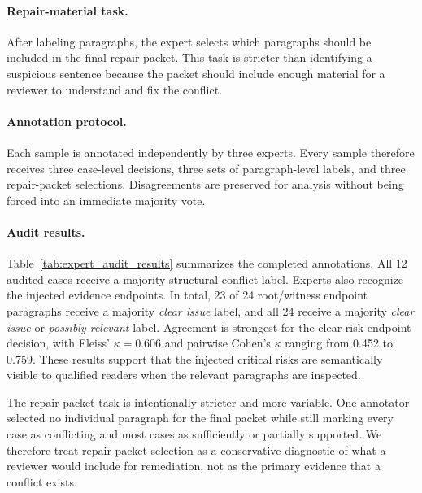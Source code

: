 \documentclass[11pt]{article}
\begin{document}
\paragraph{Repair-material task.}
After labeling paragraphs, the expert selects which paragraphs should be included in the final repair packet.  This task is stricter than identifying a suspicious sentence because the packet should include enough material for a reviewer to understand and fix the conflict.

\paragraph{Annotation protocol.}
Each sample is annotated independently by three experts.  Every sample therefore receives three case-level decisions, three sets of paragraph-level labels, and three repair-packet selections.  Disagreements are preserved for analysis without being forced into an immediate majority vote.

\paragraph{Audit results.}
Table~\ref{tab:expert_audit_results} summarizes the completed annotations.  All 12 audited cases receive a majority structural-conflict label.  Experts also recognize the injected evidence endpoints.  In total, 23 of 24 root/witness endpoint paragraphs receive a majority \emph{clear issue} label, and all 24 receive a majority \emph{clear issue} or \emph{possibly relevant} label.  Agreement is strongest for the clear-risk endpoint decision, with Fleiss' $\kappa=0.606$ and pairwise Cohen's $\kappa$ ranging from 0.452 to 0.759.  These results support that the injected critical risks are semantically visible to qualified readers when the relevant paragraphs are inspected.

The repair-packet task is intentionally stricter and more variable.  One annotator selected no individual paragraph for the final packet while still marking every case as conflicting and most cases as sufficiently or partially supported.  We therefore treat repair-packet selection as a conservative diagnostic of what a reviewer would include for remediation, not as the primary evidence that a conflict exists.
\end{document}
